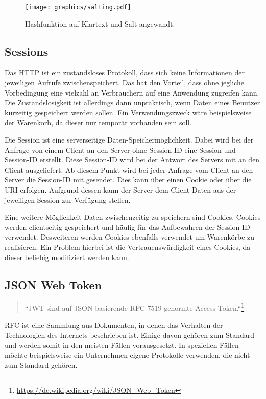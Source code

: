 \begin{figure}
	\centering
	\texttt{[image: graphics/salting.pdf]}
	\caption{Hashfunktion auf Klartext und Salt angewandt.}
	\label{fig:salted-hash}
\end{figure}

\subsection{Sessions}
\label{sec: sessions}
Das \gls{HTTP} ist ein zustandsloses Protokoll, dass sich keine Informationen der jeweiligen Aufrufe zwischenspeichert. Das hat den Vorteil, dass ohne jegliche Vorbedingung eine vielzahl an Verbrauchern auf eine Anwendung zugreifen kann. Die Zustandslosigkeit ist allerdings dann unpraktisch, wenn Daten eines Benutzer kurzeitig gespeichert werden sollen. Ein Verwendungszweck wäre beispielsweise der Warenkorb, da dieser nur temporär vorhanden sein soll. 

Die Session ist eine serverseitige Daten-Speichermöglichkeit. Dabei wird bei der Anfrage von einem Client an den Server ohne Session-ID eine Session und Session-ID erstellt. Diese Session-ID wird bei der Antwort des Servers mit an den Client ausgeliefert. Ab diesem Punkt wird bei jeder Anfrage vom Client an den Server die Session-ID mit gesendet. Dies kann über einen Cookie oder über die \gls{URI} erfolgen. Aufgrund dessen kann der Server dem Client Daten aus der jeweiligen Session zur Verfügung stellen.

Eine weitere Möglichkeit Daten zwischenzeitig zu speichern sind Cookies. Cookies werden clientseitig gespeichert und häufig für das Aufbewahren der Session-ID verwendet. Desweiteren werden Cookies ebenfalls verwendet um Warenkörbe zu realisieren. Ein Problem hierbei ist die Vertrauenswürdigkeit eines Cookies, da dieser beliebig modifiziert werden kann.

\subsection{JSON Web Token}
\label{sec: jwt}

\begin{quote}
	``\gls{JWT} sind auf \gls{JSON} basierende \gls{RFC} 7519 genormte Access-Token.``\footnote{\url{https://de.wikipedia.org/wiki/JSON_Web_Token}}
\end{quote}

\gls{RFC} ist eine Sammlung aus Dokumenten, in denen das Verhalten der Technologien des Internets beschrieben ist. Einige davon gehören zum Standard und werden somit in den meisten Fällen vorausgesetzt. In speziellen Fällen möchte beispielsweise ein Unternehmen eigene Protokolle verwenden, die nicht zum Standard gehören.

